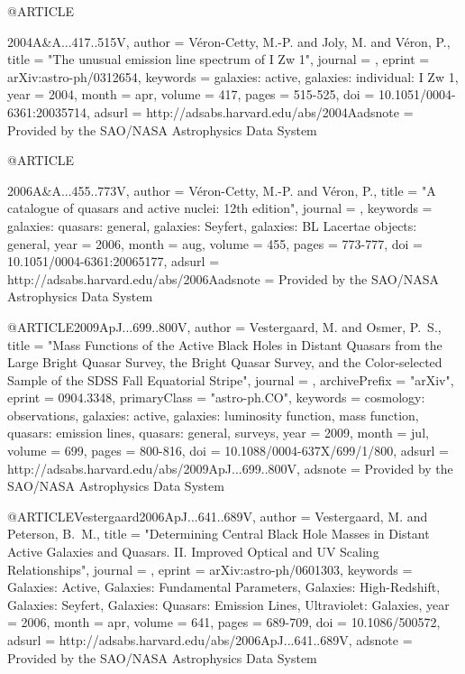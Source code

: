 \documentclass[twocolumn]{aastex62}
\begin{document}
{{{{{@ARTICLE{2004A&A...417..515V,
   author = {{V{\'e}ron-Cetty}, M.-P. and {Joly}, M. and {V{\'e}ron}, P.},
    title = "{The unusual emission line spectrum of I Zw 1}",
  journal = {\aap},
   eprint = {arXiv:astro-ph/0312654},
 keywords = {galaxies: active, galaxies: individual: I Zw 1},
     year = 2004,
    month = apr,
   volume = 417,
    pages = {515-525},
      doi = {10.1051/0004-6361:20035714},
   adsurl = {http://adsabs.harvard.edu/abs/2004Aadsnote = {Provided by the SAO/NASA Astrophysics Data System}
}


@ARTICLE{2006A&A...455..773V,
   author = {{V{\'e}ron-Cetty}, M.-P. and {V{\'e}ron}, P.},
    title = "{A catalogue of quasars and active nuclei: 12th edition}",
  journal = {\aap},
 keywords = {galaxies: quasars: general, galaxies: Seyfert, galaxies: BL Lacertae objects: general},
     year = 2006,
    month = aug,
   volume = 455,
    pages = {773-777},
      doi = {10.1051/0004-6361:20065177},
   adsurl = {http://adsabs.harvard.edu/abs/2006Aadsnote = {Provided by the SAO/NASA Astrophysics Data System}
}


@ARTICLE{2009ApJ...699..800V,
   author = {{Vestergaard}, M. and {Osmer}, P.~S.},
    title = "{Mass Functions of the Active Black Holes in Distant Quasars from the Large Bright Quasar Survey, the Bright Quasar Survey, and the Color-selected Sample of the SDSS Fall Equatorial Stripe}",
  journal = {\apj},
archivePrefix = "arXiv",
   eprint = {0904.3348},
 primaryClass = "astro-ph.CO",
 keywords = {cosmology: observations, galaxies: active, galaxies: luminosity function, mass function, quasars: emission lines, quasars: general, surveys},
     year = 2009,
    month = jul,
   volume = 699,
    pages = {800-816},
      doi = {10.1088/0004-637X/699/1/800},
   adsurl = {http://adsabs.harvard.edu/abs/2009ApJ...699..800V},
  adsnote = {Provided by the SAO/NASA Astrophysics Data System}
}


@ARTICLE{Vestergaard2006ApJ...641..689V,
   author = {{Vestergaard}, M. and {Peterson}, B.~M.},
    title = "{Determining Central Black Hole Masses in Distant Active Galaxies and Quasars. II. Improved Optical and UV Scaling Relationships}",
  journal = {\apj},
   eprint = {arXiv:astro-ph/0601303},
 keywords = {Galaxies: Active, Galaxies: Fundamental Parameters, Galaxies: High-Redshift, Galaxies: Seyfert, Galaxies: Quasars: Emission Lines, Ultraviolet: Galaxies},
     year = 2006,
    month = apr,
   volume = 641,
    pages = {689-709},
      doi = {10.1086/500572},
   adsurl = {http://adsabs.harvard.edu/abs/2006ApJ...641..689V},
  adsnote = {Provided by the SAO/NASA Astrophysics Data System}
}

}}}}}}}
\end{document}

